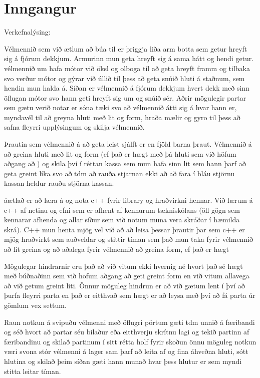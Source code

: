 \section{Inngangur}
Verkefnalýsing: 

Vélmennið sem við ætlum að búa til er þriggja liða arm botta sem getur hreyft sig á fjórum dekkjum. Armurinn mun geta hreyft sig á sama hátt og hendi getur. vélmennið um hafa mótor við öksl og olboga til að geta hreyft framm og tilbaka svo verður mótor og gýrar við úllið til þess að geta snúið hluti á staðnum, sem hendin mun halda á. Síðan er vélmennið á fjórum dekkjum hvert dekk með sinn öflugan mótor svo hann geti hreyft sig um og snúið sér. Aðrir mögulegir partar sem gætu verið notar er sóna tæki svo að vélmennið átti sig á hvar hann er, myndavél til að greyna hluti með lit og form, hraða mælir og gyro til þess að safna fleyrri upplýsingum og skilja vélmennið.

Þrautin sem vélmennið á að geta leist sjálft er en fjöld barna þraut. Vélmennið á að greina hluti með lit og form (ef það er hægt með þá hluti sem við höfum aðgang að ) og skila því í réttan kassa sem mun hafa sinn lit sem hann þarf að geta greint líka svo að tdm að rauða stjarnan ekki að að fara í bláu stjörnu kassan heldur rauðu stjörna kassan.

áætlað er að læra á og nota c++ fyrir library og hraðvirkni hennar. Við lærum á c++ af netinu og efni sem er afhent af kennurum tækniskólans (öll gögn sem kennarar afhenda og allar síður sem við notum muna vera skráðar í hæmilda skrá). C++ mun henta mjög vel við að að leisa þessar þrautir þar sem c++ er mjög hraðvirkt sem auðveldar og stittir tíman sem það mun taka fyrir vélmennið að lit greina og að aðalega fyrir vélmennið að greina form, ef það er hægt

Mögulegar hindrarnir eru það að við vitum ekki hvernig né hvort það sé hægt með búðnaðinn sem við hofum aðgang að geti greint form en við vitum allavega að við getum greint liti. Önnur möguleg hindrun er að við gætum lent í því að þurfa fleyrri parta en það er eitthvað sem hægt er að leysa með því að fá parta úr gömlum vex settum.

Raun notkun á svipuðu vélmenni með öflugri pörtum gæti tdm unnið á færibandi og séð hvort að partar séu bilaður eða eitthverju skrítnu lagi og tekið partinn af færibandinu og skilað partinum í sitt rétta holf fyrir skoðun önnu möguleg notkun væri svona stór vélmenni á lager sam þarf að leita af og fina áhveðna hluti, sótt hlutina og skilað þeim síðan gæti hann munað hvar þess hlutur er sem myndi stitta leitar tíman.

